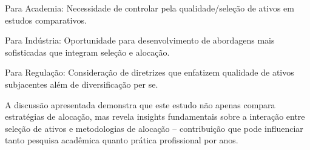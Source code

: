 Para Academia: Necessidade de controlar pela qualidade/seleção de ativos em estudos comparativos.

Para Indústria: Oportunidade para desenvolvimento de abordagens mais sofisticadas que integram seleção e alocação.

Para Regulação: Consideração de diretrizes que enfatizem qualidade de ativos subjacentes além de diversificação per se.

A discussão apresentada demonstra que este estudo não apenas compara estratégias de alocação, mas revela insights fundamentais sobre a interação entre seleção de ativos e metodologias de alocação – contribuição que pode influenciar tanto pesquisa acadêmica quanto prática profissional por anos.